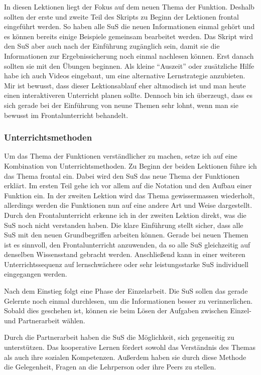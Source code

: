 \documentclass[
  10pt,
  a4paper,
  DIV=11]{scrartcl}
\theoremstyle{definition}
\theoremstyle{remark}
\begin{document}
\begin{tcolorbox}
In diesen Lektionen liegt der Fokus auf dem neuen Thema der Funktion.
Deshalb sollten der erste und zweite Teil des Skripts zu Beginn der
Lektionen frontal eingeführt werden. So haben alle SuS die neuen
Informationen einmal gehört und es können bereits einige Beispiele
gemeinsam bearbeitet werden. Das Skript wird den SuS aber auch nach der
Einführung zugänglich sein, damit sie die Informationen zur
Ergebnissicherung noch einmal nachlesen können. Erst danach sollten sie
mit den Übungen beginnen. Als kleine ``Auszeit'' oder zusätzliche Hilfe
habe ich auch Videos eingebaut, um eine alternative Lernstrategie
anzubieten. Mir ist bewusst, dass dieser Lektionsablauf eher altmodisch
ist und man heute einen interaktiveren Unterricht planen sollte. Dennoch
bin ich überzeugt, dass es sich gerade bei der Einführung von neune
Themen sehr lohnt, wenn man sie bewusst im Frontalunterricht behandelt.

\subsubsection{Unterrichtsmethoden}\label{unterrichtsmethoden}

Um das Thema der Funktionen verständlicher zu machen, setze ich auf eine
Kombination von Unterrichtsmethoden. Zu Beginn der beiden Lektionen
führe ich das Thema frontal ein. Dabei wird den SuS das neue Thema der
Funktionen erklärt. Im ersten Teil gehe ich vor allem auf die Notation
und den Aufbau einer Funktion ein. In der zweiten Lektion wird das Thema
gewissermassen wiederholt, allerdings werden die Funktionen nun auf eine
andere Art und Weise dargestellt. Durch den Frontalunterricht erkenne
ich in der zweiten Lektion direkt, was die SuS noch nicht verstanden
haben. Die klare Einführung stellt sicher, dass alle SuS mit den neuen
Grundbegriffen arbeiten können. Gerade bei neuen Themen ist es sinnvoll,
den Frontalunterricht anzuwenden, da so alle SuS gleichzeitig auf
denselben Wissensstand gebracht werden. Anschließend kann in einer
weiteren Unterrichtssequenz auf lernschwächere oder sehr leistungsstarke
SuS individuell eingegangen werden.

Nach dem Einstieg folgt eine Phase der Einzelarbeit. Die SuS sollen das
gerade Gelernte noch einmal durchlesen, um die Informationen besser zu
verinnerlichen. Sobald dies geschehen ist, können sie beim Lösen der
Aufgaben zwischen Einzel- und Partnerarbeit wählen.

Durch die Partnerarbeit haben die SuS die Möglichkeit, sich gegenseitig
zu unterstützen. Das kooperative Lernen fördert sowohl das Verständnis
des Themas als auch ihre sozialen Kompetenzen. Außerdem haben sie durch
diese Methode die Gelegenheit, Fragen an die Lehrperson oder ihre Peers
zu stellen.


\end{tcolorbox}
\end{document}
